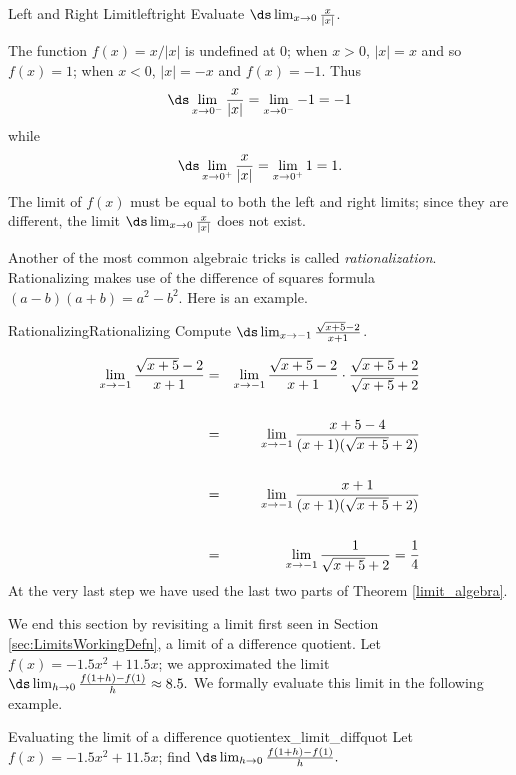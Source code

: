 \begin{example}{Left and Right Limit}{leftright}
Evaluate $\ds\lim_{x\to 0}{x\over|x|}$.
\end{example}

\begin{solution} 
The function $f(x)=x/|x|$ is undefined at 0; when $x>0$, $|x|=x$ and
so $f(x)=1$; when $x<0$, $|x|=-x$ and $f(x)=-1$. Thus
$$\ds \lim_{x\to 0^-}{x\over|x|}=\lim_{x\to 0^-}-1=-1$$
while 
$$\ds \lim_{x\to 0^+}{x\over|x|}=\lim_{x\to 0^+}1=1.$$
The limit of $f(x)$ must be equal to both the left and right limits; since they are
different, the limit $\ds \lim_{x\to 0}{x\over|x|}$ does not exist.
\end{solution}

Another of the most common algebraic tricks is called \textit{rationalization}. 
Rationalizing makes use of the difference of squares formula $(a-b)(a+b)=a^2-b^2$.
Here is an example.

\begin{example}{Rationalizing}{Rationalizing}
Compute $\ds\lim_{x\to-1} {\sqrt{x+5}-2\over x+1}$.
\end{example}

\begin{solution} 
\begin{eqnarray*}
\lim_{x\to-1} {\sqrt{x+5}-2\over x+1}&=&
\lim_{x\to-1} {\sqrt{x+5}-2\over x+1}\cdot{\sqrt{x+5}+2\over \sqrt{x+5}+2}\cr
\\
&=&\lim_{x\to-1} {x+5-4\over (x+1)(\sqrt{x+5}+2)}\cr
\\
&=&\lim_{x\to-1} {x+1\over (x+1)(\sqrt{x+5}+2)}\cr
\\
&=&\lim_{x\to-1} {1\over \sqrt{x+5}+2}={1\over4}
\end{eqnarray*}
At the very last step we have used the last two parts of Theorem  \ref{limit_algebra}.
\end{solution}
																															


We end this section by revisiting a limit first seen in Section \ref{sec:LimitsWorkingDefn}, a limit of a difference quotient. Let $f(x) = -1.5x^2+11.5x$; we approximated the limit $\ds \lim_{h\to 0}\frac{f(1+h)-f(1)}{h}\approx 8.5.$ We formally evaluate this limit in the following example.\\

\begin{example}{Evaluating the limit of a difference quotient}{ex_limit_diffquot}{
Let $f(x) = -1.5x^2+11.5x$; find $\ds \lim_{h\to 0}\frac{f(1+h)-f(1)}{h}.$}
\end{example}



